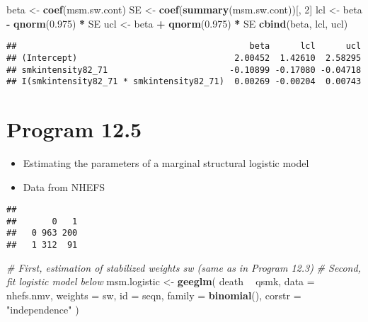 \documentclass[
  10pt,
]{book}
\newenvironment{Shaded}{\begin{snugshade}}{\end{snugshade}}
\newcommand{\CommentTok}[1]{\textcolor[rgb]{0.56,0.35,0.01}{\textit{#1}}}
\newcommand{\DataTypeTok}[1]{\textcolor[rgb]{0.13,0.29,0.53}{#1}}
\newcommand{\DecValTok}[1]{\textcolor[rgb]{0.00,0.00,0.81}{#1}}
\newcommand{\FloatTok}[1]{\textcolor[rgb]{0.00,0.00,0.81}{#1}}
\newcommand{\KeywordTok}[1]{\textcolor[rgb]{0.13,0.29,0.53}{\textbf{#1}}}
\newcommand{\NormalTok}[1]{#1}
\newcommand{\OperatorTok}[1]{\textcolor[rgb]{0.81,0.36,0.00}{\textbf{#1}}}
\newcommand{\StringTok}[1]{\textcolor[rgb]{0.31,0.60,0.02}{#1}}
\providecommand{\tightlist}{%
  \setlength{\itemsep}{0pt}\setlength{\parskip}{0pt}}
\begin{document}
\begin{Shaded}
\begin{Highlighting}[]
\NormalTok{beta <-}\StringTok{ }\KeywordTok{coef}\NormalTok{(msm.sw.cont)}
\NormalTok{SE <-}\StringTok{ }\KeywordTok{coef}\NormalTok{(}\KeywordTok{summary}\NormalTok{(msm.sw.cont))[, }\DecValTok{2}\NormalTok{]}
\NormalTok{lcl <-}\StringTok{ }\NormalTok{beta }\OperatorTok{-}\StringTok{ }\KeywordTok{qnorm}\NormalTok{(}\FloatTok{0.975}\NormalTok{) }\OperatorTok{*}\StringTok{ }\NormalTok{SE}
\NormalTok{ucl <-}\StringTok{ }\NormalTok{beta }\OperatorTok{+}\StringTok{ }\KeywordTok{qnorm}\NormalTok{(}\FloatTok{0.975}\NormalTok{) }\OperatorTok{*}\StringTok{ }\NormalTok{SE}
\KeywordTok{cbind}\NormalTok{(beta, lcl, ucl)}
\end{Highlighting}
\end{Shaded}

\begin{verbatim}
##                                              beta      lcl      ucl
## (Intercept)                               2.00452  1.42610  2.58295
## smkintensity82_71                        -0.10899 -0.17080 -0.04718
## I(smkintensity82_71 * smkintensity82_71)  0.00269 -0.00204  0.00743
\end{verbatim}

\hypertarget{program-12.5}{%
\section{Program 12.5}\label{program-12.5}}

\begin{itemize}
\tightlist
\item
  Estimating the parameters of a marginal structural logistic model
\item
  Data from NHEFS
\end{itemize}

\begin{Shaded}
\end{Shaded}

\begin{verbatim}
##    
##       0   1
##   0 963 200
##   1 312  91
\end{verbatim}

\begin{Shaded}
\begin{Highlighting}[]
\CommentTok{# First, estimation of stabilized weights sw (same as in Program 12.3)}
\CommentTok{# Second, fit logistic model below}
\NormalTok{msm.logistic <-}\StringTok{ }\KeywordTok{geeglm}\NormalTok{(}
\NormalTok{  death }\OperatorTok{~}\StringTok{ }\NormalTok{qsmk,}
  \DataTypeTok{data =}\NormalTok{ nhefs.nmv,}
  \DataTypeTok{weights =}\NormalTok{ sw,}
  \DataTypeTok{id =}\NormalTok{ seqn,}
  \DataTypeTok{family =} \KeywordTok{binomial}\NormalTok{(),}
  \DataTypeTok{corstr =} \StringTok{"independence"}
\NormalTok{)}
\end{Highlighting}
\end{Shaded}
\end{document}
